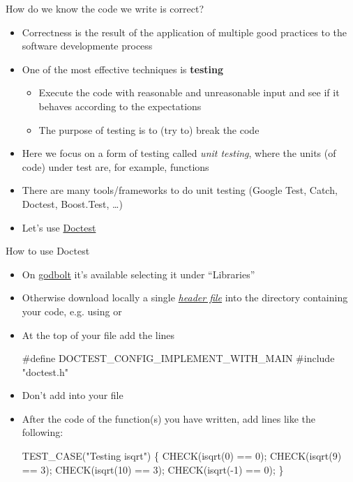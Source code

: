 \begin{frame}[fragile]{How do we know the code we write is correct?}

  \begin{itemize}[<+->]
  \item Correctness is the result of the application of multiple good practices
    to the software developmente process
  \item One of the most effective techniques is \textbf{testing}
    \begin{itemize}
    \item Execute the code with reasonable and unreasonable input and see if it
      behaves according to the expectations
    \item The purpose of testing is to (try to) \alert{break} the code
    \end{itemize}
  \item Here we focus on a form of testing called \textit{unit testing}, where
    the units (of code) under test are, for example, functions
  \item There are many tools/frameworks to do unit testing (Google Test, Catch,
    Doctest, Boost.Test, \ldots)
  \item Let's use \href{https://github.com/onqtam/doctest}{Doctest}
  \end{itemize}
\end{frame}

\begin{frame}[fragile]{How to use Doctest}

  \begin{itemize}
  \item On \href{https://godbolt.org/}{godbolt} it's available selecting it
    under ``Libraries''
  \item Otherwise download locally a single
    \href{https://raw.githubusercontent.com/onqtam/doctest/master/doctest/doctest.h}{\textit{header
        file}} into the directory containing your code, e.g. using 
    or 
  \item At the top of your \Cpp{} file add the lines
    \begin{codeblock}
#define DOCTEST\_CONFIG\_IMPLEMENT\_WITH\_MAIN
#include "doctest.h"\end{codeblock}
  \item Don't add  into your file
  \item After the code of the function(s) you have written, add lines like the
    following:
    \begin{codeblock}
TEST_CASE("Testing isqrt") \{
  CHECK(isqrt(0) == 0);
  CHECK(isqrt(9) == 3);
  CHECK(isqrt(10) == 3);
  CHECK(isqrt(-1) == 0);
  \ddd
\}\end{codeblock}

  \end{itemize}

\end{frame}

